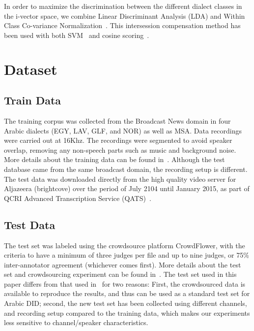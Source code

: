 \documentclass{article}
\newcommand{\ra}[1]{\renewcommand{\arraystretch}{#1}}
\begin{document}
In order to maximize the discrimination between the different dialect classes in the i-vector space, we combine Linear Discriminant Analysis (LDA) and Within Class Co-variance Normalization~\cite{dehak2011language}. This intersession compensation method has been used with both SVM~\cite{dehak2011language} and cosine scoring~\cite{bahari2014non}. 
\section{Dataset}
\label{sec:data}

 \subsection{Train Data}

The training corpus was collected from the Broadcast News domain in four Arabic dialects (EGY, LAV, GLF, and NOR) as well as MSA. Data recordings were carried out at 16Khz. The recordings were segmented to avoid speaker overlap, removing any non-speech parts such as music and background noise. More details about the training data can be found in~\cite{bahari2014non}. Although the test database came from the same broadcast domain, the recording setup is different. The test data was downloaded directly from the high quality video server for Aljazeera (brightcove) over the period of July 2104 until January 2015, as part of QCRI Advanced Transcription Service (QATS)~\cite{ali2014qcri}.
\begin{table}[pht!]
\centering
\ra{1.3}
\caption{\textit{Number of hours of speech available for each dialect.}}\label{tab:data1}
\end{table}
\subsection{Test Data}
\label{testset}
The test set was labeled using the crowdsource platform CrowdFlower, with the criteria to have a minimum of three judges per file and up to nine judges, or 75\% inter-annotator agreement (whichever comes first). More details about the test set and crowdsourcing experiment can be found in~\cite{samn2015crowdsource}. The test set used in this paper differs from that used in~\cite{bahari2014non} for two reasons: First, the crowdsourced data is available to reproduce the results, and thus can be used as a standard test set for Arabic DID; second, the new test set has been collected using different channels, and recording setup compared to the training data, which makes our experiments less sensitive to channel/speaker characteristics.
\end{document}
